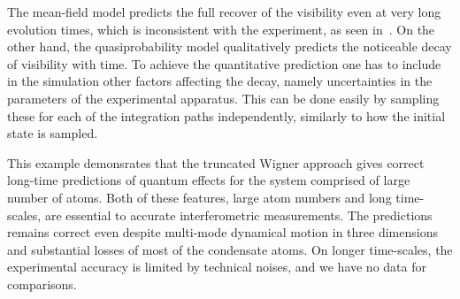 The mean-field model predicts the full recover of the visibility even at very long evolution times, which is inconsistent with the experiment, as seen in~.
On the other hand, the quasiprobability model qualitatively predicts the noticeable decay of visibility with time.
To achieve the quantitative prediction one has to include in the simulation other factors affecting the decay, namely uncertainties in the parameters of the experimental apparatus.
This can be done easily by sampling these for each of the  integration paths independently, similarly to how the initial state is sampled.

This example demonsrates that the truncated Wigner approach gives correct long-time predictions of quantum effects for the system comprised of large number of atoms.
Both of these features, large atom numbers and long time-scales, are essential to accurate interferometric measurements.
The predictions remains correct even despite multi-mode dynamical motion in three dimensions and substantial losses of most of the condensate atoms.
On longer time-scales, the experimental accuracy is limited by technical noises, and we have no data for comparisons.
